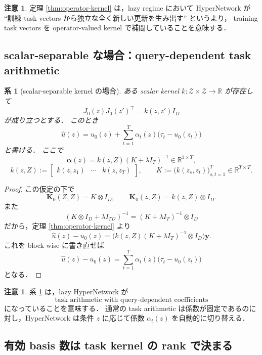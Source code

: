 \documentclass[a4paper,11pt]{bxjsarticle}
\newtheorem{corollary}[theorem]{系}
\theoremstyle{definition}
\newtheorem{remark}[theorem]{注意}
\begin{document}
\begin{remark}
定理 \ref{thm:operator-kernel} は，lazy regime において HyperNetwork が
``訓練 task vectors から独立な全く新しい更新を生み出す'' というより，
training task vectors を operator-valued kernel で補間していることを意味する．
\end{remark}

\subsection{scalar-separable な場合：query-dependent task arithmetic}

\begin{corollary}[scalar-separable kernel の場合]
\label{cor:scalar-separable}
ある scalar kernel $k:\mathcal{Z}\times\mathcal{Z}\to \mathbb{R}$ が存在して
\[
J_0(z)J_0(z')^\top = k(z,z')I_D
\]
が成り立つとする．
このとき
\[
\hat u(z)=u_0(z)+\sum_{t=1}^T \alpha_t(z)\bigl(\tau_t-u_0(z_t)\bigr)
\]
と書ける．
ここで
\[
\bm{\alpha}(z)=k(z,Z)(K+\lambda I_T)^{-1}\in \mathbb{R}^{1\times T},
\]
\[
k(z,Z):=\begin{bmatrix}k(z,z_1)&\cdots&k(z,z_T)\end{bmatrix},
\qquad
K:=\bigl(k(z_s,z_t)\bigr)_{s,t=1}^T \in \mathbb{R}^{T\times T}.
\]
\end{corollary}

\begin{proof}
この仮定の下で
\[
\mathbf{K}_0(Z,Z)=K\otimes I_D,\qquad
\mathbf{K}_0(z,Z)=k(z,Z)\otimes I_D.
\]
また
\[
(K\otimes I_D+\lambda I_{TD})^{-1}=(K+\lambda I_T)^{-1}\otimes I_D
\]
だから，定理 \ref{thm:operator-kernel} より
\[
\hat u(z)-u_0(z)
=
\bigl(k(z,Z)(K+\lambda I_T)^{-1}\otimes I_D\bigr)\mathbf{y}.
\]
これを block-wise に書き直せば
\[
\hat u(z)-u_0(z)=\sum_{t=1}^T \alpha_t(z)\bigl(\tau_t-u_0(z_t)\bigr)
\]
となる．
\end{proof}

\begin{remark}
系 \ref{cor:scalar-separable} は，lazy HyperNetwork が
\[
\text{task arithmetic with query-dependent coefficients}
\]
になっていることを意味する．
通常の task arithmetic は係数が固定であるのに対し，HyperNetwork は条件 $z$ に応じて係数 $\alpha_t(z)$ を自動的に切り替える．
\end{remark}

\subsection{有効 basis 数は task kernel の rank で決まる}
\end{document}
